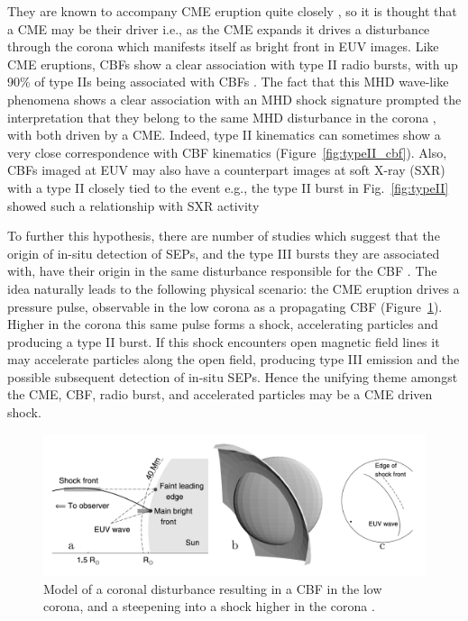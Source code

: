 They are known to accompany CME eruption quite closely \citep{bieseker2002}, so it is thought that a CME may be their driver i.e., as the CME expands it drives a disturbance through the corona which manifests itself as bright front in EUV images. Like CME eruptions, CBFs show a clear association with type II radio bursts, with up 90\% of type IIs being associated with CBFs \citep{klassen2000}. The fact that this MHD wave-like phenomena shows a clear association with an MHD shock signature prompted the interpretation that they belong to the same MHD disturbance in the corona \citep{warmuth2004b}, with both driven by a CME. Indeed, type II kinematics can sometimes show a very close correspondence with CBF kinematics \citep{vrsna2005, grechnev2011} (Figure~\ref{fig:typeII_cbf}). Also, CBFs imaged at EUV may also have a counterpart images at soft X-ray (SXR) with a type II closely tied to the event e.g., the type II burst in Fig.~\ref{fig:typeII} showed such a relationship with SXR activity \citep{khan2002}


To further this hypothesis, there are number of studies which suggest that the origin of in-situ detection of SEPs, and the type III bursts they are associated with, have their origin in the same disturbance responsible for the CBF \citep{klassen2002, krucker1999, kozarev2011}. The idea naturally leads to the following physical scenario: the CME eruption drives a pressure pulse, observable in the low corona as a propagating CBF (Figure~\ref{fig:shock_cbf}). Higher in the corona this same pulse forms a shock, accelerating particles and producing a type II burst. If this shock encounters open magnetic field lines it may accelerate particles along the open field, producing type III emission and the possible subsequent detection of in-situ SEPs. Hence the unifying theme amongst the CME, CBF, radio burst, and accelerated particles {\color{blue} may be a} CME driven shock.
\begin{figure}[!t]
\begin{center}
\includegraphics[scale=0.25, trim=1cm 0cm 0cm 2cm]{images/shock_sim}
\caption[Model of EUV wave and coronal shock]{Model of a coronal disturbance resulting in a CBF in the low corona, and a steepening into a shock higher in the corona \citep{grechnev2011a}.}
\label{fig:shock_cbf}
\end{center}
\end{figure}

